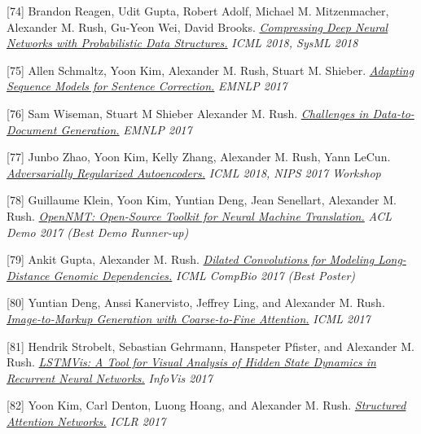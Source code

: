 \documentclass[10pt]{article}
\begin{document}
\medskip


[74] \ind Brandon Reagen, Udit Gupta, Robert Adolf, Michael M. Mitzenmacher, Alexander M. Rush, Gu-Yeon Wei, David Brooks. \emph{\href{ https://www.sysml.cc/doc/68.pdf }{ Compressing Deep Neural Networks with Probabilistic Data Structures.} }\emph{ ICML 2018, SysML 2018 }

\medskip


[75] \ind Allen Schmaltz, Yoon Kim, Alexander M. Rush, Stuart M. Shieber. \emph{\href{ https://arxiv.org/abs/1707.09067 }{ Adapting Sequence Models for Sentence Correction.} }\emph{ EMNLP 2017 }

\medskip


[76] \ind Sam Wiseman, Stuart M Shieber Alexander M. Rush. \emph{\href{ https://arxiv.org/abs/1707.08052 }{ Challenges in Data-to-Document Generation.} }\emph{ EMNLP 2017 }

\medskip


[77] \ind Junbo Zhao, Yoon Kim, Kelly Zhang, Alexander M. Rush, Yann LeCun. \emph{\href{ https://arxiv.org/abs/1706.04223 }{ Adversarially Regularized Autoencoders.} }\emph{ ICML 2018, NIPS 2017 Workshop }

\medskip


[78] \ind Guillaume Klein, Yoon Kim, Yuntian Deng, Jean Senellart, Alexander M. Rush. \emph{\href{ https://arxiv.org/abs/1701.02810 }{ OpenNMT: Open-Source Toolkit for Neural Machine Translation.} }\emph{ ACL Demo 2017 (Best Demo Runner-up) }

\medskip


[79] \ind Ankit Gupta, Alexander M. Rush. \emph{\href{ https://arxiv.org/abs/1710.01278 }{ Dilated Convolutions for Modeling Long-Distance Genomic Dependencies.} }\emph{ ICML CompBio 2017 (Best Poster) }

\medskip


[80] \ind Yuntian Deng, Anssi Kanervisto, Jeffrey Ling, and Alexander M. Rush. \emph{\href{ http://lstm.seas.harvard.edu/latex/ }{ Image-to-Markup Generation with Coarse-to-Fine Attention.} }\emph{ ICML 2017 }

\medskip


[81] \ind Hendrik Strobelt, Sebastian Gehrmann, Hanspeter Pfister, and Alexander M. Rush. \emph{\href{ http://lstm.seas.harvard.edu/ }{ LSTMVis: A Tool for Visual Analysis of Hidden State Dynamics in Recurrent Neural Networks.} }\emph{ InfoVis 2017 }

\medskip


[82] \ind Yoon Kim, Carl Denton, Luong Hoang, and Alexander M. Rush. \emph{\href{ https://arxiv.org/abs/1702.00887 }{ Structured Attention Networks.} }\emph{ ICLR 2017 }
\end{document}

